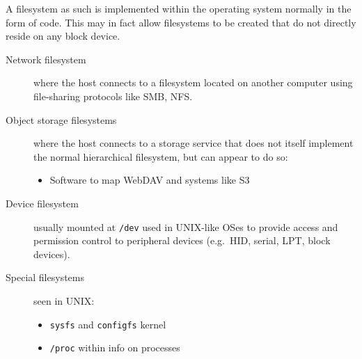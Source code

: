 \documentclass[slides]{pgnotes}
\begin{document}
A filesystem as such is implemented within the operating system normally
in the form of code. This may in fact allow filesystems to be created
that do not directly reside on any block device.

\begin{description}
\item[Network filesystem]
where the host connects to a filesystem located on another computer
using file-sharing protocols like SMB, NFS.
\item[Object storage filesystems]
where the host connects to a storage service that does not itself
implement the normal hierarchical filesystem, but can appear to do so:

\begin{itemize}

\item
  Software to map WebDAV and systems like S3
\end{itemize}
\item[Device filesystem]
usually mounted at \texttt{/dev} used in UNIX-like OSes to provide
access and permission control to peripheral devices (e.g.~HID, serial,
LPT, block devices).
\item[Special filesystems]
seen in UNIX:

\begin{itemize}
\item
  \texttt{sysfs} and \texttt{configfs} kernel
\item
  \texttt{/proc} within info on processes
\end{itemize}
\end{description}
\end{document}
